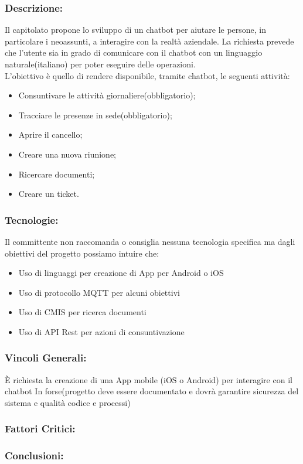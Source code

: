 \subsubsection{Descrizione:}
Il capitolato propone lo sviluppo di un chatbot per aiutare le persone, in particolare i neoassunti, a interagire con la realtà aziendale.
La richiesta prevede che l'utente sia in grado di comunicare con il chatbot con un linguaggio naturale(italiano) per poter eseguire delle operazioni. \\
L'obiettivo è quello di rendere disponibile, tramite chatbot, le seguenti attività:
\begin{itemize}
	\item Consuntivare le attività giornaliere(obbligatorio);
	\item Tracciare le presenze in sede(obbligatorio);
	\item Aprire il cancello;
	\item Creare una nuova riunione;
	\item Ricercare documenti;
	\item Creare un ticket.
	
\end{itemize}

\subsubsection{Tecnologie:}
Il committente non raccomanda o consiglia nessuna tecnologia specifica ma dagli obiettivi del progetto possiamo intuire che:
\begin{itemize}
	\item Uso di linguaggi per creazione di App per Android o iOS
	\item Uso di protocollo MQTT per alcuni obiettivi
	\item Uso di CMIS per ricerca documenti
	\item Uso di API Rest per azioni di consuntivazione  
\end{itemize}

\subsubsection{Vincoli Generali:}
È richiesta la creazione di una App mobile (iOS o Android) per interagire con il chatbot
In forse(progetto deve essere documentato e dovrà garantire sicurezza del sistema e qualità codice e processi)


\subsubsection{Fattori Critici:}

\subsubsection{Conclusioni:}
